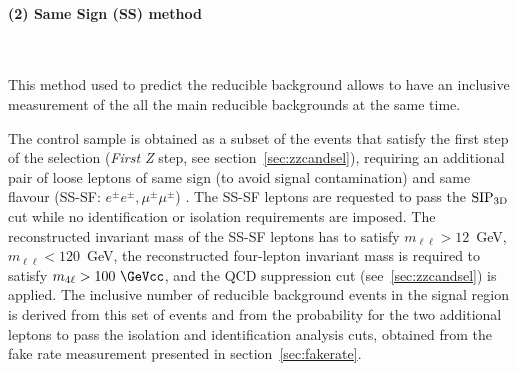 %
%
%
%

\paragraph{(2) Same Sign (SS) method} \\
\par This method used to predict the reducible background allows to
have an inclusive measurement of the all the main reducible
backgrounds at the same time.

The control sample is obtained as a subset of the events that satisfy
the first step of the selection ({\it First Z} step, see
section~\ref{sec:zzcandsel}), requiring an additional pair of
loose leptons of same sign (to avoid signal contamination) and same
flavour (SS-SF: $e^{\pm}e^{\pm}, \mu^{\pm}\mu^{\pm}$) .  The SS-SF
leptons are requested to pass the ${\rm SIP_{3D}}$ cut while no
identification or isolation requirements are imposed.  The
reconstructed invariant mass of the SS-SF leptons has to satisfy
$m_{ \ell \ell} > 12$~GeV, $m_{ \ell \ell} < 120$~GeV,
the reconstructed four-lepton
invariant mass is required to satisfy $m_{4\ell} > 100~\GeVcc$,
and the QCD suppression cut (see~\ref{sec:zzcandsel}) is applied.
The inclusive number of reducible background events in the
signal region is derived from this set of events and from the probability for the
two additional leptons to pass the isolation and identification
analysis cuts, obtained from the fake rate measurement presented in section~\ref{sec:fakerate}.

